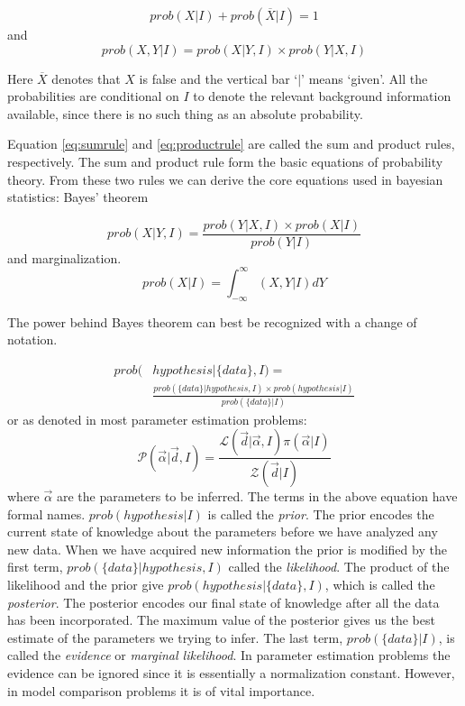 \documentclass[12pt]{article}
\numberwithin{equation}{section}
\begin{document}
\begin{equation} \label{eq:sumrule}
	prob(X|I) + prob(\overline{X}|I) = 1
\end{equation}
and 
\begin{equation} \label{eq:productrule}
	prob(X,Y|I) = prob(X|Y,I) \times prob(Y|X,I)
\end{equation}

Here $\overline{X}$ denotes that $X$ is false and the vertical bar `$|$' means `given'. All the probabilities are conditional on $I$ to denote the relevant background information available, since there is no such thing as an absolute probability. 

Equation \ref{eq:sumrule} and \ref{eq:productrule} are called the sum and product rules, respectively. The sum and product rule form the basic equations of probability theory. From these two rules we can derive the core equations used in bayesian statistics: Bayes' theorem

\begin{equation} \label{eq:bayes1}
	prob(X|Y,I) = \frac{prob(Y|X,I) \times prob(X|I)}{prob(Y|I)}
\end{equation}
and marginalization.
\begin{equation} \label{eq:marginalization}
	prob(X|I) = \int_{-\infty}^{\infty}{(X,Y|I)dY}
\end{equation}

The power behind Bayes theorem can best be recognized with a change of notation. 

\begin{align}\label{eq:bayes2}
	prob(&hypothesis|\{data\},I) =  \nonumber \\ 
	& \frac{prob(\{data\}|hypothesis,I) \times prob(hypothesis|I)}{prob(\{data\}|I)}
\end{align}
or as denoted in most parameter estimation problems:
\begin{equation} \label{eq:bayes3}
	\mathcal{P}(\vec{\alpha}|\vec{d},I) = \frac{\mathcal{L}(\vec{d}|\vec{\alpha},I)\pi(\vec{\alpha}|I)}{\mathcal{Z}(\vec{d}|I)}
\end{equation}
where $\vec{\alpha}$ are the parameters to be inferred.
The terms in the above equation have formal names. $prob(hypothesis|I)$ is called the \emph{prior}. The prior encodes the current state of knowledge about the parameters before we have analyzed any new data. When we have acquired new information the prior is modified by the first term, $prob(\{data\}|hypothesis,I)$ called the 
\emph{likelihood}. The product of the likelihood and the prior give $prob(hypothesis|\{data\},I)$, which is called the \emph{posterior}. The posterior encodes our final state of knowledge after all the data has been incorporated. The maximum value of the posterior gives us the best estimate of the parameters we trying to infer. The last term, $prob(\{data\}|I)$, is called the \emph{evidence} or \emph{marginal likelihood}. In parameter estimation problems the evidence can be ignored since it is essentially a normalization constant. However, in model comparison problems it is of vital importance.
\end{document}
